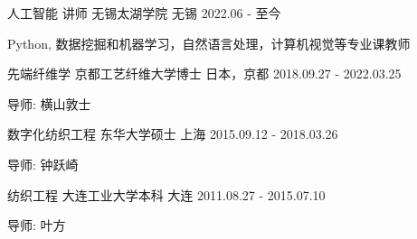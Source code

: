 \begin{cventries}
  \cventry
    {人工智能 \quad 讲师} %
    {无锡太湖学院} %
    {无锡} %
    {2022.06 - 至今} %
    {
      \begin{cvitems} %
        \item {Python, 数据挖掘和机器学习，自然语言处理，计算机视觉等专业课教师}
      \end{cvitems}
    }
\end{cventries}

\begin{cventries}
  \cventry
    {先端纤维学} %
    {京都工艺纤维大学\quad 博士} %
    {日本，京都} %
    {2018.09.27 - 2022.03.25} %
    {
      \begin{cvitems} %
        \item {导师: 横山敦士}
      \end{cvitems}
    }

  \cventry
    {数字化纺织工程 } %
    {东华大学\quad 硕士} %
    {上海} %
    {2015.09.12 - 2018.03.26} %
    {
      \begin{cvitems} %
        \item {导师: 钟跃崎}
      \end{cvitems}
    }

  \cventry
    {纺织工程 } %
    {大连工业大学\quad 本科} %
    {大连} %
    {2011.08.27 - 2015.07.10} %
    {
      \begin{cvitems} %
        \item {导师: 叶方}
      \end{cvitems}
    }
\end{cventries}
